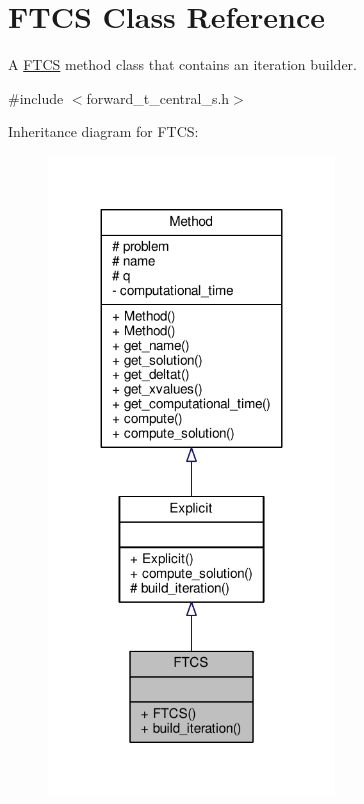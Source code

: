 \hypertarget{classFTCS}{}\section{F\+T\+CS Class Reference}
\label{classFTCS}


A \hyperlink{classFTCS}{F\+T\+CS} method class that contains an iteration builder.  




{\ttfamily \#include $<$forward\+\_\+t\+\_\+central\+\_\+s.\+h$>$}



Inheritance diagram for F\+T\+CS\+:
\nopagebreak
\begin{figure}[H]
\begin{center}
\leavevmode
\includegraphics[width=215pt]{classFTCS__inherit__graph}
\end{center}
\end{figure}


